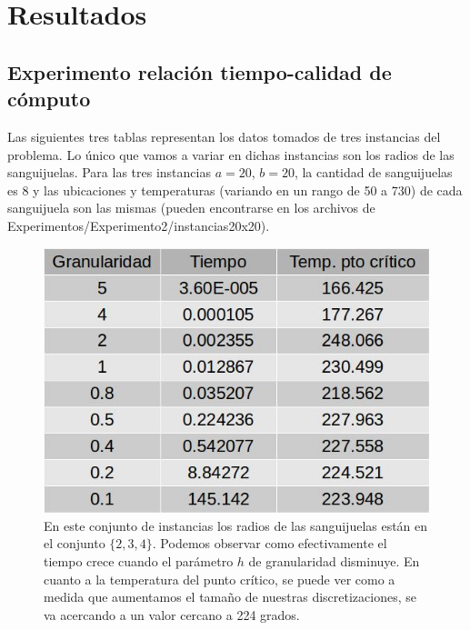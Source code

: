 \section{Resultados}
\subsection{Experimento relación tiempo-calidad de cómputo}
Las siguientes tres tablas representan los datos tomados de tres instancias del problema. Lo único que vamos a variar en dichas instancias son los radios de las sanguijuelas. Para las tres instancias $a = 20$, $b = 20$, la cantidad de sanguijuelas es 8 y las ubicaciones y temperaturas (variando en un rango de 50 a 730) de cada sanguijuela son las mismas (pueden encontrarse en los archivos de Experimentos/Experimento2/instancias20x20).
\newline
\begin{figure}[H]
\centering
\includegraphics[scale=0.4]{../../Experimentos/Experimento2/instancia20x20_1.jpg}\caption{En este conjunto de instancias los radios de las sanguijuelas están en el conjunto $\{2, 3, 4\}$. Podemos observar como efectivamente el tiempo crece cuando el parámetro $h$ de granularidad disminuye. En cuanto a la temperatura del punto crítico, se puede ver como a medida que aumentamos el tamaño de nuestras discretizaciones, se va acercando a un valor cercano a 224 grados.}
\end{figure}

